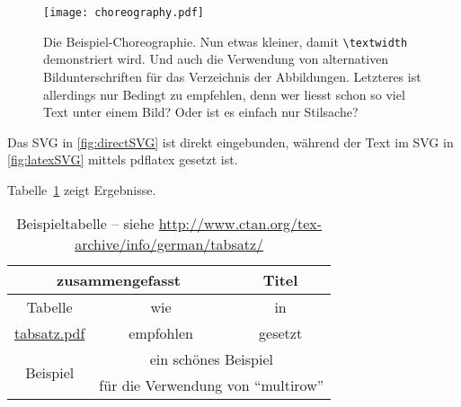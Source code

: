 \begin{figure}
  \begin{center}
    \texttt{[image: choreography.pdf]}
    \caption[Beispiel-Choreographie]{Die Beispiel-Choreographie. Nun etwas kleiner, damit \texttt{\textbackslash textwidth} demonstriert wird. Und auch die Verwendung von alternativen Bildunterschriften für das Verzeichnis der Abbildungen. Letzteres ist allerdings nur Bedingt zu empfehlen, denn wer liesst schon so viel Text unter einem Bild? Oder ist es einfach nur Stilsache?}
    \label{fig:chor2}
  \end{center}
\end{figure}

Das SVG in \cref{fig:directSVG} ist direkt eingebunden, während der Text im SVG in \cref{fig:latexSVG} mittels pdflatex gesetzt ist.

\iffalse %
\begin{figure}
\centering
\texttt{[image: svgexample.svg]}
\caption{SVG direkt eingebunden}
\label{fig:directSVG}
\end{figure}

\begin{figure}
\centering
\def\svgwidth{.4\textwidth}

\caption{Text im SVG mittels \LaTeX{} gesetzt}
\label{fig:latexSVG}
\end{figure}
\fi %

Tabelle~\ref{tab:Ergebnisse} zeigt Ergebnisse.
\begin{table}
  \begin{center}
    \begin{tabular}{ccc}
	\toprule
	\multicolumn{2}{c}{\textbf{zusammengefasst}} & \textbf{Titel} \\ \midrule
	Tabelle & wie & in \\
	\url{tabsatz.pdf}& empfohlen & gesetzt\\
	
	\multirow{2}{*}{Beispiel} & \multicolumn{2}{c}{ein schönes Beispiel}\\
	 & \multicolumn{2}{c}{für die Verwendung von \enquote{multirow}}\\
	\bottomrule
    \end{tabular}
    \caption[Beispieltabelle]{Beispieltabelle -- siehe \url{http://www.ctan.org/tex-archive/info/german/tabsatz/}}
    \label{tab:Ergebnisse}
  \end{center}
\end{table}
